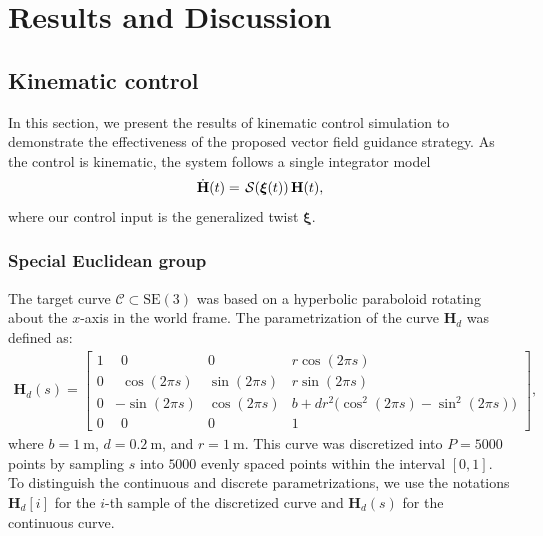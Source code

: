 \chapter{Results and Discussion}\label{ch:results}
\section{Kinematic control}
In this section, we present the results of  kinematic control simulation to demonstrate the effectiveness of the proposed vector field guidance strategy.  As the control is kinematic, the system follows a single integrator model
\begin{align}
    \dot{\mathbf{H}}(t) = \SL[\boldsymbol{\xi}(t)]\mathbf{H}(t),
\end{align}
where our control input is the generalized twist $\boldsymbol{\xi}$.
\subsection{Special Euclidean group}
The target curve $\mathcal{C}\subset\text{SE}(3)$ was based on a hyperbolic paraboloid rotating about the $x$-axis in the world frame. The parametrization of the curve $\mathbf{H}_d$ was defined as:
\begin{align}
    \mathbf{H}_d(s) = \begin{bmatrix}
        1 & \ \ 0 & 0 & r\cos(2\pi s)\\
        0 & \ \ \cos(2\pi s) & \sin(2\pi s) & r\sin(2\pi s)\\
        0 & -\sin(2\pi s) & \cos(2\pi s) & b + dr^2\bigl(\cos^2(2\pi s) - \sin^2(2\pi s)\bigr)\\
        0 & \ \ 0 & 0 & 1
    \end{bmatrix},
\end{align}
where $b=\qty{1}{\meter}$, $d=\qty{0.2}{\meter}$, and $r=\qty{1}{\meter}$. This curve was discretized into $P=\num{5000}$ points by sampling $s$ into $\num{5000}$ evenly spaced points within the interval $[0, 1]$. To distinguish the continuous and discrete parametrizations, we use the notations $\mathbf{H}_d[i]$ for the $i$-th sample of the discretized curve and $\mathbf{H}_d(s)$ for the continuous curve.
